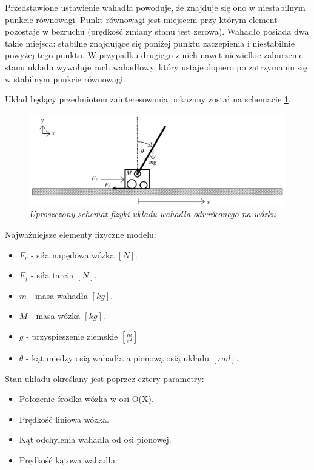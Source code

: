 \documentclass[12pt, oneside]{report}
\theoremstyle{definition}
\begin{document}
Przedstawione ustawienie wahadła powoduje, że znajduje się ono w niestabilnym punkcie równowagi. Punkt równowagi jest miejscem przy którym element pozostaje w bezruchu (prędkość zmiany stanu jest zerowa). Wahadło posiada dwa takie miejsca: stabilne znajdujące się poniżej punktu zaczepienia i niestabilnie powyżej tego punktu. W przypadku drugiego z nich nawet niewielkie zaburzenie stanu układu wywołuje ruch wahadłowy, który ustaje dopiero po zatrzymaniu się w stabilnym punkcie równowagi. 


Układ będący przedmiotem zainteresowania pokazany został na schemacie \ref{SytemSchemeImage}.

\begin{figure}[H]
	\centering
		\includegraphics[width = 375pt]{SystemScheme} 
		\caption{\textit{Uproszczony schemat fizyki układu wahadła odwróconego na wózku \cite{LMIP} }}
		\label{SytemSchemeImage}
\end{figure}

Najważniejsze elementy fizyczne modelu:
\begin{itemize}
\item \(F_v\) - siła napędowa wózka \([N]\).
\item \(F_f\) - siła tarcia \([N]\).
\item \(m\) - masa wahadła \([kg]\). 
\item \(M\) - masa wózka \([kg]\).
\item \(g\) - przyspieszenie ziemskie \([\frac{m}{s^2}]\) 
\item \(\theta\) - kąt między osią wahadła a pionową osią układu \([rad]\).
\end{itemize}

Stan układu określany jest poprzez cztery parametry:
\begin{itemize}
\item Położenie środka wózka w osi O(X).
\item Prędkość liniowa wózka.
\item Kąt odchylenia wahadła od osi pionowej.
\item Prędkość kątowa wahadła.
\end{itemize}
\end{document}
